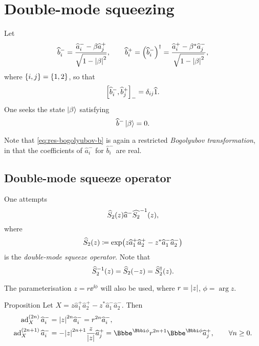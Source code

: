 \section{Double-mode squeezing}

Let
\begin{equation}
\widehat{b}_i^-
= \frac{\widehat{a}_i^- - \beta \widehat{a}_j^+}{\sqrt{1-{\left|\beta\right|}^2}},\qquad
\widehat{b}_i^+ = {\left(\widehat{b}_i^-\right)}^\dagger
= \frac{\widehat{a}_i^+ - \beta^*\widehat{a}_j^-}{\sqrt{1-{\left|\beta\right|}^2}},
\end{equation}
where ${\left\{i, j\right\}} = {\left\{1,2\right\}}$, so that
\begin{equation}
{\left[\widehat{b}_i^-, \widehat{b}_j^+\right]}_- =
\delta_{ij}\widehat{1}.
\end{equation}
One seeks the state $\Ket{\beta}$ satisfying
\begin{equation}
\widehat{b}^-\Ket{\beta} = 0.
\end{equation}

Note that \cref{eq:res-bogolyubov-b} is again a restricted \emph{Bogolyubov
transformation}, in that the coefficients of $\widehat{a}_i^-$ for 
$\widehat{b}_i^-$ are real.

\subsection{Double-mode squeeze operator}
One attempts
\begin{equation}
{\widehat{S}_2}\mathopen{}\left(z\right)\mathclose{}\widehat{a}^-{\widehat{S_2}^{-1}}\mathopen{}\left(z\right)\mathclose{},
\end{equation}
where
\begin{equation}
{\widehat{S}_2}\mathopen{}\left(z\right)\mathclose{} \coloneqq {\exp}\mathopen{}\left(z \widehat{a}_1^+ \widehat{a}_2^+ 
- z^*\widehat{a}_1^-\widehat{a}_2^-\right)\mathclose{}
\end{equation}
is the \emph{double-mode squeeze operator}. Note that
\begin{equation}
{\widehat{S}_2^{-1}}\mathopen{}\left(z\right)\mathclose{} = {\widehat{S}_2}\mathopen{}\left(-z\right)\mathclose{}
= {\widehat{S}_2^\dagger}\mathopen{}\left(z\right)\mathclose{}.
\end{equation}

The parameterisation $z = r\ee^{\ii\phi}$ will also be used, where $r = 
{\left|z\right|}$, $\phi = \arg z$.

\begin{namedthm}{Proposition}
Let $X = z \widehat{a}_1^+ \widehat{a}_2^+ - z^*\widehat{a}_1^-\widehat{a}_2^-$. 
Then
\begin{align}
	\ad_X^{(2n)} \widehat{a}_i^- &= \vbr{z}^{2n} \widehat{a}_i^-
	= r^{2n} \widehat{a}_i^-,\\
	\ad_X^{(2n+1)} \widehat{a}_i^-
	&= -\vbr{z}^{2n+1}\frac{z}{\vbr{z}}\widehat{a}_j^+
	= \ee^{\ii\phi} r^{2n+1}\ee^{\ii\phi} \widehat{a}_j^+,
	\qquad \forall n \ge 0.
\end{align}
\end{namedthm} %

